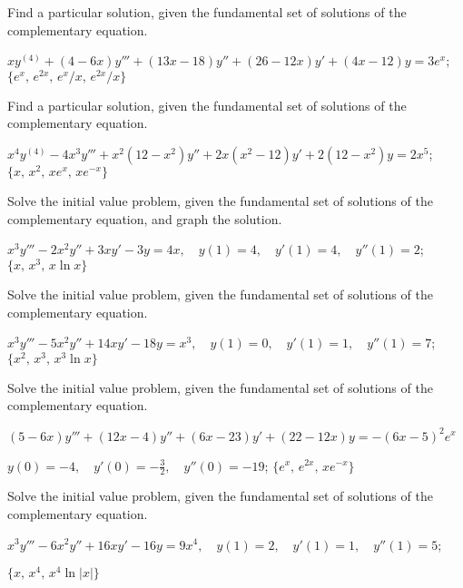 \documentclass{ximera}
\begin{document}
\begin{problem}\label{exer:9.4.20}
Find a particular
solution, given the fundamental set of solutions of the complementary equation.

$xy^{(4)}+(4-6x)y'''+(13x-18)y''+(26-12x)y'+(4x-12)y=3e^x$; \quad
 $\{e^x,\,e^{2x},\,e^x/x,\,e^{2x}/x\}$
\end{problem}

\begin{problem}\label{exer:9.4.21}
Find a particular
solution, given the fundamental set of solutions of the complementary equation.

$x^4y^{(4)}-4x^3y'''+x^2(12-x^2)y''+2x(x^2-12)y'+2(12-x^2)y=2x^5$;
 $\{x,\,x^2,\,xe^x,\,xe^{-x}\}$
\end{problem}

\begin{problem}\label{exer:9.4.22} Solve the
initial value problem, given the fundamental set of solutions of the complementary equation, and graph the solution.

$x^3y'''-2x^2y''+3xy'-3y=4x, \quad  y(1)=4,\quad y'(1)=4,
\quad y''(1)=2$; \quad     $\{x,\,x^3,\,x \ln x\}$
\end{problem}

\begin{problem}\label{exer:9.4.23}
Solve the
initial value problem, given the fundamental set of solutions of the complementary equation.

$x^3y'''-5x^2y''+14xy'-18y=x^3, \quad  y(1)=0,\quad y'(1)=1,\quad
y''(1)=7$;
\quad $\{x^2,\, x^3,\,x^3 \ln x\}$
\end{problem}

\begin{problem}\label{exer:9.4.24}
Solve the
initial value problem, given the fundamental set of solutions of the complementary equation.

$(5-6x)y'''+(12x-4)y''+(6x-23)y'+(22-12x)y=-(6x-5)^2e^x$


$y(0)=-4, \quad  y'(0)=-\frac{3}{2},\quad y''(0)=-19$;\quad
 $\{e^x,\,e^{2x},\,xe^{-x} \}$
\end{problem}

\begin{problem}\label{exer:9.4.25}
Solve the
initial value problem, given the fundamental set of solutions of the complementary equation.

$x^3y'''-6x^2y''+16xy'-16y=9x^4, \quad  y(1)=2,\quad y'(1)=1,\quad y''(1)=5$;

 $\{x,\,x^4,\,x^4 \ln |x|\}$
\end{problem}
\end{document}
